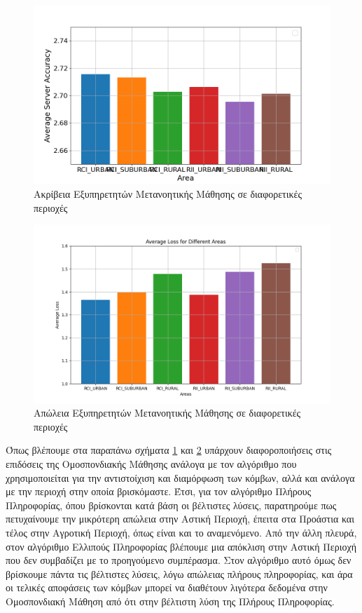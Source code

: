 \begin{figure}[H]
    \centering
    \includegraphics[width=\textwidth]{figures/chapter4/Area_Average_Accuracy.png}
    \caption{Ακρίβεια Εξυπηρετητών Μετανοητικής Μάθησης σε διαφορετικές περιοχές}
    \label{fig21}
\end{figure}

\begin{figure}[H]
    \centering
    \includegraphics[width=\textwidth]{figures/chapter4/Area_of_Average_Loss.png}
    \caption{Απώλεια Εξυπηρετητών Μετανοητικής Μάθησης σε διαφορετικές περιοχές}
    \label{fig22}
\end{figure}

\newpage

Όπως βλέπουμε στα παραπάνω σχήματα \ref{fig21} και \ref{fig22} υπάρχουν διαφοροποιήσεις στις επιδόσεις της Ομοσπονδιακής Μάθησης ανάλογα με τον αλγόριθμο που χρησιμοποιείται για την αντιστοίχιση και διαμόρφωση των κόμβων, αλλά και ανάλογα με την περιοχή στην οποία βρισκόμαστε. Έτσι, για τον αλγόριθμο Πλήρους Πληροφορίας, όπου βρίσκονται κατά βάση οι βέλτιστες λύσεις, παρατηρούμε πως πετυχαίνουμε την μικρότερη απώλεια στην Αστική Περιοχή, έπειτα στα Προάστια και τέλος στην Αγροτική Περιοχή, όπως είναι και το αναμενόμενο. Από την άλλη πλευρά, στον αλγόριθμο Ελλιπούς Πληροφορίας βλέπουμε μια απόκλιση στην Αστική Περιοχή που δεν συμβαδίζει με το προηγούμενο συμπέρασμα. Στον αλγόριθμο αυτό όμως δεν βρίσκουμε πάντα τις βέλτιστες λύσεις, λόγω απώλειας πλήρους πληροφορίας, και άρα οι τελικές αποφάσεις των κόμβων μπορεί να διαθέτουν λιγότερα δεδομένα στην Ομοσπονδιακή Μάθηση από ότι στην βέλτιστη λύση της Πλήρους Πληροφορίας.

